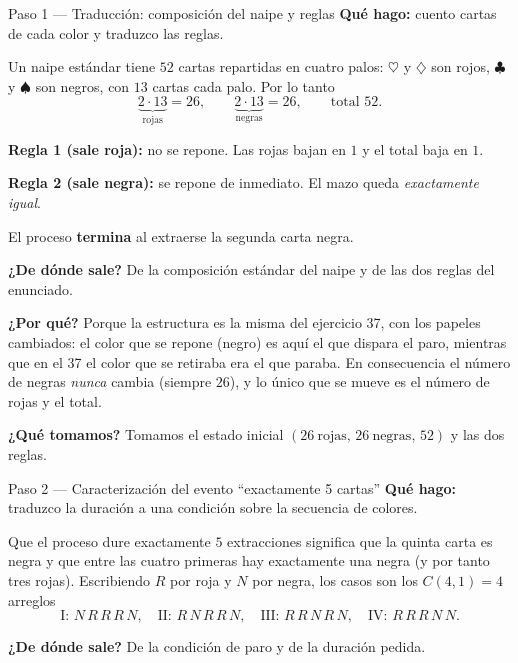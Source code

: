 \documentclass[11pt]{article}
\begin{document}
\begin{sol}

\begin{paso}{Paso 1 --- Traducci\'on: composici\'on del naipe y reglas}
\textbf{Qu\'e hago:} cuento cartas de cada color y traduzco las reglas.

Un naipe est\'andar tiene $52$ cartas repartidas en cuatro palos: $\heartsuit$ y $\diamondsuit$ son rojos, $\clubsuit$ y $\spadesuit$ son negros, con $13$ cartas cada palo. Por lo tanto
\[
\underbrace{2\cdot 13}_{\text{rojas}}=26,
\qquad
\underbrace{2\cdot 13}_{\text{negras}}=26,
\qquad \text{total } 52 .
\]

\textbf{Regla 1 (sale roja):} no se repone. Las rojas bajan en $1$ y el total baja en $1$.

\textbf{Regla 2 (sale negra):} se repone de inmediato. El mazo queda \emph{exactamente igual}.

El proceso \textbf{termina} al extraerse la segunda carta negra.

\textbf{¿De d\'onde sale?} De la composici\'on est\'andar del naipe y de las dos reglas del enunciado.

\textbf{¿Por qu\'e?} Porque la estructura es la misma del ejercicio 37, con los papeles cambiados: el color que se repone (negro) es aqu\'i el que dispara el paro, mientras que en el 37 el color que se retiraba era el que paraba. En consecuencia el n\'umero de negras \emph{nunca} cambia (siempre $26$), y lo \'unico que se mueve es el n\'umero de rojas y el total.

\textbf{¿Qu\'e tomamos?} Tomamos el estado inicial $(26\ \text{rojas},\,26\ \text{negras},\,52)$ y las dos reglas.
\end{paso}

\begin{paso}{Paso 2 --- Caracterizaci\'on del evento ``exactamente 5 cartas''}
\textbf{Qu\'e hago:} traduzco la duraci\'on a una condici\'on sobre la secuencia de colores.

Que el proceso dure exactamente $5$ extracciones significa que la quinta carta es negra y que entre las cuatro primeras hay exactamente una negra (y por tanto tres rojas). Escribiendo $R$ por roja y $N$ por negra, los casos son los $C(4,1)=4$ arreglos
\[
\text{I: } N\,R\,R\,R\,N,
\quad
\text{II: } R\,N\,R\,R\,N,
\quad
\text{III: } R\,R\,N\,R\,N,
\quad
\text{IV: } R\,R\,R\,N\,N .
\]

\textbf{¿De d\'onde sale?} De la condici\'on de paro y de la duraci\'on pedida.


\end{paso}
\end{sol}
\end{document}
